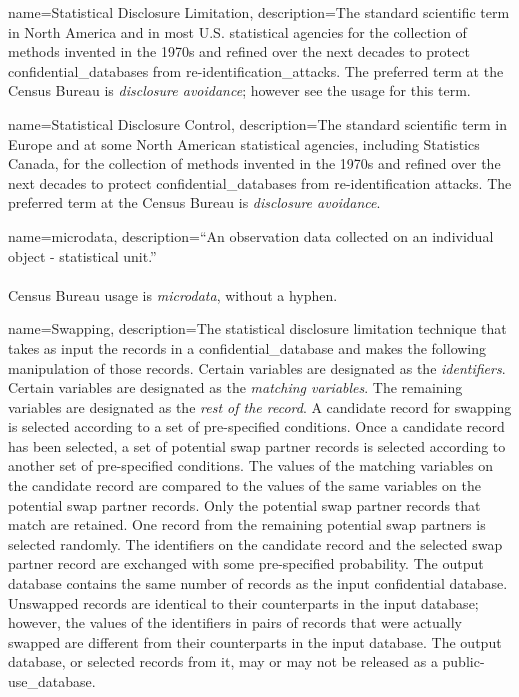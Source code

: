 {
    name=Statistical Disclosure Limitation,
    description={The standard scientific term in North America and in most U.S. statistical agencies for the collection of methods invented in the 1970s and refined over the next decades to protect \glspl{confidential_database} from \glspl{re-identification_attack}. The preferred term at the Census Bureau is \textit{disclosure avoidance}; however see the usage for this term.}
}

{
    name=Statistical Disclosure Control,
    description={The standard scientific term in Europe and at some North American statistical agencies, including Statistics Canada, for the collection of methods invented in the 1970s and refined over the next decades to protect \glspl{confidential_database} from re-identification attacks. The preferred term at the Census Bureau is \textit{disclosure avoidance}.}
}

{
    name=microdata,
    description={``An observation data collected on an individual
    object - statistical unit.'' \parencite{oecd_oecd_nodate}\\
    \\
    Census Bureau usage is \textit{microdata}, without a hyphen.}
}

{
    name=Swapping,
    description={The statistical disclosure limitation technique that takes as input the \glspl{record} in a \gls{confidential_database} and makes the following manipulation of those records. Certain variables are designated as the \textit{identifiers}. Certain variables are designated as the \textit{matching variables}. The remaining variables are designated as the \textit{rest of the record}. A candidate record for swapping is selected according to a set of pre-specified conditions. Once a candidate record has been selected, a set of potential swap partner records is selected according to another set of pre-specified conditions. The values of the matching variables on the candidate record are compared to the values of the same variables on the potential swap partner records. Only the potential swap partner records that match are retained. One record from the remaining potential swap partners is selected randomly. The identifiers on the candidate record and the selected swap partner record are exchanged with some pre-specified probability. The output database contains the same number of records as the input confidential database. Unswapped records are identical to their counterparts in the input database; however, the values of the identifiers in pairs of records that were actually swapped are different from their counterparts in the input database. The output database, or selected records from it, may or may not be released as a \gls{public-use_database}.}
}

